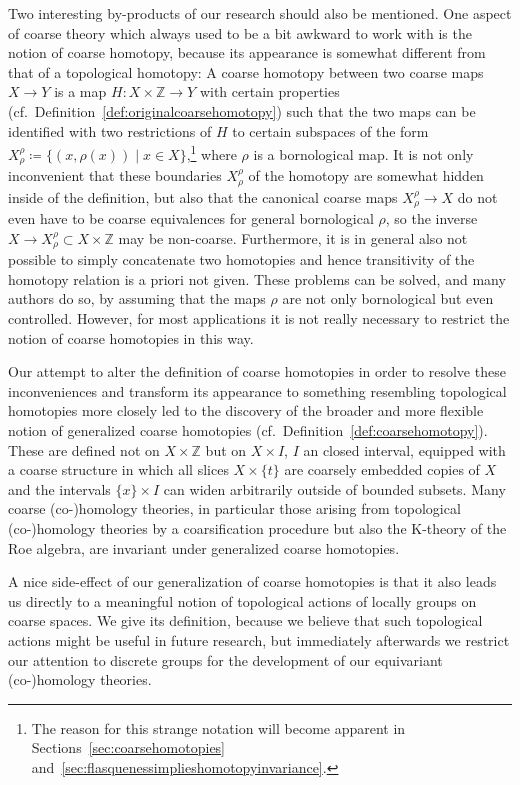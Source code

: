 \documentclass[pdftex]{sigma}
\numberwithin{equation}{section}
\theoremstyle{definition}
\newcommand{\Z}{\mathbb{Z}}
\newcommand{\K}{\mathrm{K}}
\begin{document}
Two interesting by-products of our research should also be mentioned.
One aspect of coarse theory which always used to be a bit awkward to work with is the notion of coarse homotopy, because its appearance is somewhat different from that of a topological homotopy: A coarse homotopy between two coarse maps $X\to Y$ is a map $H\colon X\times \Z\to Y$ with certain properties (cf.~Definition~\ref{def:originalcoarsehomotopy}) such that the two maps can be identified with two restrictions of $H$ to certain subspaces of the form $X_\rho^\rho\coloneqq\{(x,\rho(x))\mid x\in X\}$,\footnote{The reason for this strange notation will become apparent in Sections~\ref{sec:coarsehomotopies} and~\ref{sec:flasquenessimplieshomotopyinvariance}.} where $\rho$ is a bornological map.
It is not only inconvenient that these boundaries $X_\rho^\rho$ of the homotopy are somewhat hidden inside of the definition, but also that the canonical coarse maps $X_\rho^\rho\to X$ do not even have to be coarse equivalences for general bornological $\rho$, so the inverse $X\to X_\rho^\rho\subset X\times \Z$ may be non-coarse. Furthermore, it is in general also not possible to simply concatenate two homotopies and hence transitivity of the homotopy relation is a priori not given.
These problems can be solved, and many authors do so, by assuming that the maps $\rho$ are not only bornological but even controlled. However, for most applications it is not really necessary to restrict the notion of coarse homotopies in this way.

Our attempt to alter the definition of coarse homotopies in order to resolve these inconveniences and transform its appearance to something resembling topological homotopies more closely led to the discovery of the broader and more flexible notion of generalized coarse homotopies (cf.~Definition~\ref{def:coarsehomotopy}). These are defined not on $X\times\Z$ but on $X\times I$, $I$ an closed interval, equipped with a coarse structure in which all slices $X\times\{t\}$ are coarsely embedded copies of $X$ and the intervals $\{x\}\times I$ can widen arbitrarily outside of bounded subsets.
Many coarse \mbox{(co-)}homology theories, in particular those arising from topological \mbox{(co-)}homology theories by a coarsification procedure but also the $\K$-theory of the Roe algebra, are invariant under generalized coarse homotopies.

A nice side-effect of our generalization of coarse homotopies is that it also leads us directly to a meaningful notion of topological actions of locally groups on coarse spaces. We give its definition, because we believe that such topological actions might be useful in future research, but immediately afterwards we restrict our attention to discrete groups for the development of our equivariant \mbox{(co-)}homology theories.
\end{document}
